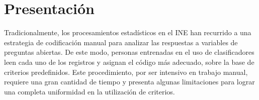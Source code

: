 \documentclass[
  12pt,
  spanish,
]{article}
\author{}
\date{\vspace{-2.5em}}
\begin{document}
\newpage
\begin{spacing}{0.9} 
\tableofcontents
\end{spacing}

\newpage

\begin{spacing}{0.9} 
\listoftables
\end{spacing}

\newpage
\listoffigures
\newpage
\normalsize

\hypertarget{presentaciuxf3n}{%
\section{Presentación}\label{presentaciuxf3n}}

Tradicionalmente, los procesamientos estadísticos en el INE han
recurrido a una estrategia de codificación manual para analizar las
respuestas a variables de preguntas abiertas. De este modo, personas
entrenadas en el uso de clasificadores leen cada uno de los registros y
asignan el código más adecuado, sobre la base de criterios predefinidos.
Este procedimiento, por ser intensivo en trabajo manual, requiere una
gran cantidad de tiempo y presenta algunas limitaciones para lograr una
completa uniformidad en la utilización de criterios.
\end{document}
